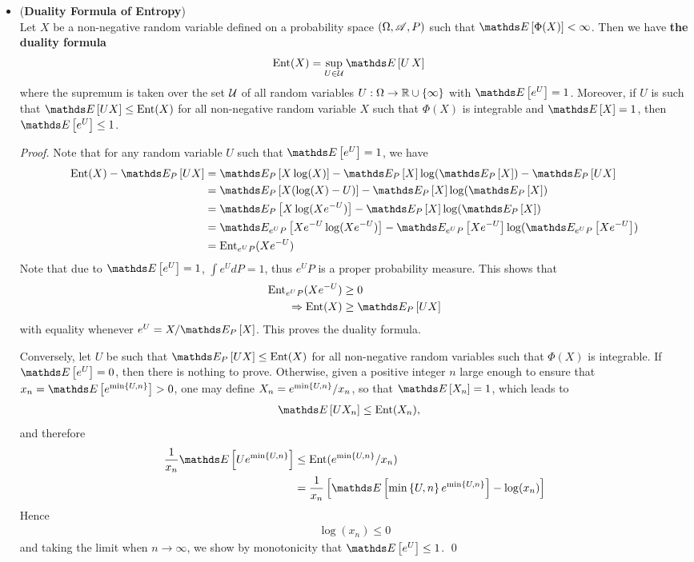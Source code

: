 \documentclass[11pt]{article}
\begin{document}
\begin{itemize}
\item \begin{theorem}(\textbf{Duality Formula of Entropy}) \citep{boucheron2013concentration}\\
Let $X$ be a non-negative random variable defined on a probability space $(\Omega, {\mathscr A}, P)$ such that $\E{}{\Phi(X)} < \infty$. Then we have \textbf{the duality formula}
\begin{align}
\text{Ent}(X) &= \sup_{U \in \cU}\E{}{U\,X}  \label{eqn: duality_entropy}
\end{align} where the supremum is taken over the set ${\mathcal U}$ of all random variables $U: \Omega \to {\mathbb R} \cup \left\{\infty\right\}$ with $\E{}{e^{U}} = 1$. Moreover, if $U$ is such that $\E{}{U X} \le \text{Ent}(X)$ for all non-negative random variable $X$ such that $\Phi(X)$ is integrable and $\E{}{X} = 1$, then $\E{}{e^{U}} \le 1$. 
\end{theorem}
\begin{proof}
Note that for any random variable $U$ such that $\E{}{e^{U}} = 1$, we have
\begin{align*}
\text{Ent}(X) - \E{P}{UX} &= \E{P}{X\log(X)} - \E{P}{X}\log(\E{P}{X}) - \E{P}{UX}\\
&= \E{P}{X(\log(X) - U)}  - \E{P}{X}\log(\E{P}{X}) \\
&= \E{P}{X\log(Xe^{-U})} - \E{P}{X}\log(\E{P}{X})\\
&= \E{e^{U}P}{Xe^{-U}\log(Xe^{-U})} - \E{e^{U}P}{Xe^{-U}}\log(\E{e^{U}P}{Xe^{-U}}) \\
&= \text{Ent}_{e^{U}P}(Xe^{-U})
\end{align*} Note that due to $\E{}{e^{U}} = 1$, $\int e^{U}dP = 1$, thus $e^{U}P$ is a proper probability measure. This shows that
\begin{align*}
\text{Ent}_{e^{U}P}(Xe^{-U}) &\ge 0\\
\Rightarrow \text{Ent}(X) &\ge \E{P}{UX}
\end{align*}  with equality whenever $e^U = X/\E{P}{X}$. This proves the duality formula. 

Conversely, let $U$ be such that $\E{P}{UX} \le \text{Ent}(X)$ for all non-negative random variables such that $\Phi(X)$ is integrable. If $\E{}{e^{U}} = 0$, then there is nothing to prove. Otherwise, given a positive integer $n$ large enough to ensure that $x_n = \E{}{e^{\min\set{U, n}}} >0$, one may define $X_n = e^{\min\left\{U, n\right\}}/x_n$, so that $\E{}{X_n} = 1$, which leads to 
\begin{align*}
\E{}{UX_n} &\le  \text{Ent}(X_n),
\end{align*} and therefore
\begin{align*}
\frac{1}{x_n}\E{}{U e^{\min\set{U, n}}} &\le \text{Ent}(e^{\min\set{U, n}}/x_n)\\
&= \frac{1}{x_n}\brac{\E{}{\min\set{U, n} e^{\min\set{U, n}} }  - \log(x_n)} 
\end{align*} Hence 
\begin{align*}
\log(x_n) \le 0
\end{align*} and taking the limit when $n\to \infty$, we show by monotonicity that $\E{}{e^{U}} \le 1$. \qed
\end{proof}


\end{itemize}
\end{document}
